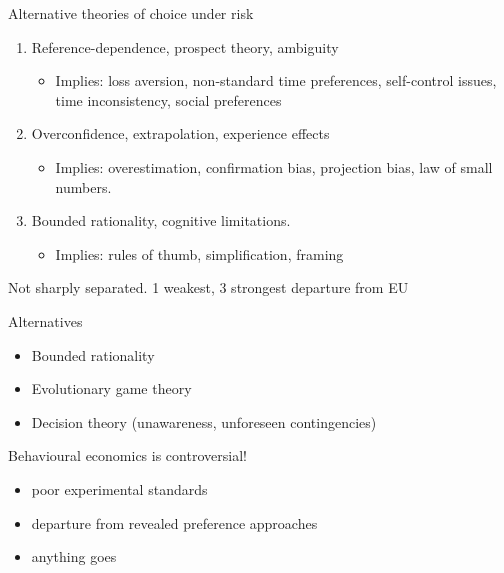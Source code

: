 \documentclass[11pt, aspectratio=169]{beamer}
\begin{document}
\begin{frame}{Alternative theories of choice under risk}
    \begin{enumerate}
        \item Reference-dependence, prospect theory, ambiguity\medskip
        \begin{itemize}
        \item Implies: loss aversion, non-standard time preferences, self-control issues, time inconsistency, social preferences
        \end{itemize}\bigskip
        \item Overconfidence, extrapolation, experience effects\medskip
         \begin{itemize}
        \item Implies: overestimation, confirmation bias, projection bias, law of small numbers.  \end{itemize}\bigskip
        \item Bounded rationality, cognitive limitations.\medskip
        \begin{itemize}
        \item Implies: rules of thumb, simplification, framing
        \end{itemize}\bigskip
    \end{enumerate}

    Not sharply separated.  1 weakest, 3 strongest departure  from EU
\end{frame}

\begin{frame}{Alternatives}
    \begin{itemize}
        \item Bounded rationality\bigskip
        \item Evolutionary game theory\bigskip
        \item Decision theory (unawareness, unforeseen contingencies)\bigskip
    \end{itemize}\bigskip
\end{frame}
\begin{frame}{Behavioural economics is controversial!}
    \begin{itemize}
        \item poor experimental standards\medskip
        \item departure from revealed preference approaches\medskip
        \item anything goes\medskip
    \end{itemize}
\end{frame}
\end{document}

